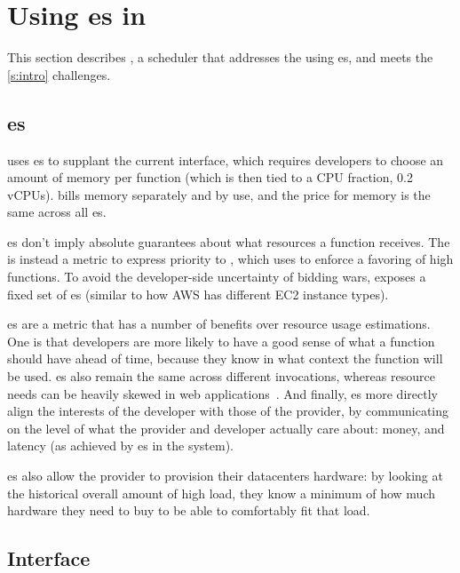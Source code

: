 \section{Using \priceclass{}es in \Sys}\label{design}

This section describes \sys{}, a scheduler that addresses the \problem{} using
\priceclass{}es, and meets the \autoref{s:intro} challenges.

\subsection{\Priceclass{}es}

\Sys{} uses \class{}es to supplant the current interface, which requires
developers to choose an amount of memory per function (which is then tied to a
CPU fraction, \eg{} 0.2 vCPUs).  \Sys{} bills memory separately and by use, and
the price for memory is the same across all \class{}es.

\Priceclass{}es don't imply absolute guarantees about what resources a function
receives.  The \priceclass{} is instead a metric to express priority to \sys{},
which \sys{} uses to enforce a favoring of high \class{} functions.  To avoid
the developer-side uncertainty of bidding wars, \sys{} exposes a fixed set of
\priceclass{}es (similar to how AWS has different EC2 instance types).

\Priceclass{}es are a metric that has a number of benefits over resource usage
estimations. One is that developers are more likely to have a good sense of what
\priceclass{} a function should have ahead of time, because they know in what
context the function will be used. \Priceclass{}es also remain the same across
different invocations, whereas resource needs can be heavily skewed in web
applications~\cite{hermod,serverless-in-the-wild}. And finally, \class{}es more
directly align the interests of the developer with those of the provider, by
communicating on the level of what the provider and developer actually care
about: money, and latency (as achieved by \class{}es in the system).

\Priceclass{}es also allow the provider to provision their datacenters hardware:
by looking at the historical overall amount of high \priceclass{} load, they
know a minimum of how much hardware they need to buy to be able to comfortably
fit that load.

\subsection{Interface}

